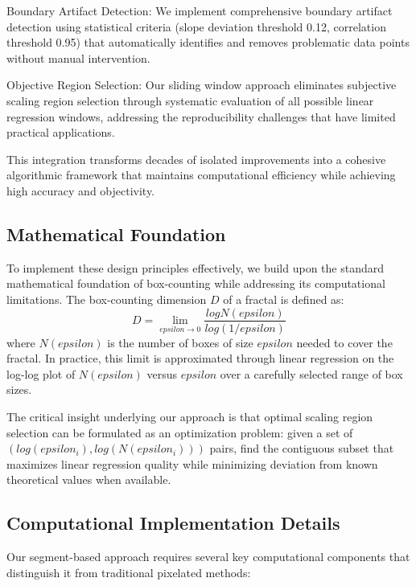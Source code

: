 \documentclass[preprint,12pt]{elsarticle}
\def\textbf#1{#1}%
\def\log{log}%
\def\epsilon{epsilon}%
\begin{document}
\textbf{Boundary Artifact Detection}: We implement comprehensive boundary artifact detection using statistical criteria (slope deviation threshold 0.12, correlation threshold 0.95) that automatically identifies and removes problematic data points without manual intervention.

\textbf{Objective Region Selection}: Our sliding window approach eliminates subjective scaling region selection through systematic evaluation of all possible linear regression windows, addressing the reproducibility challenges that have limited practical applications.

This integration transforms decades of isolated improvements into a cohesive algorithmic framework that maintains computational efficiency while achieving high accuracy and objectivity.

\subsection{Mathematical Foundation}

To implement these design principles effectively, we build upon the standard mathematical foundation of box-counting while addressing its computational limitations.
The box-counting dimension $D$ of a fractal is defined as:
\begin{equation}
D = \lim_{\epsilon \to 0} \frac{\log N(\epsilon)}{\log(1/\epsilon)}
\label{eq:box_counting_def}
\end{equation}
where $N(\epsilon)$ is the number of boxes of size $\epsilon$ needed to cover the fractal. In practice, this limit is approximated through linear regression on the log-log plot of $N(\epsilon)$ versus $\epsilon$ over a carefully selected range of box sizes.

The critical insight underlying our approach is that optimal scaling region selection can be formulated as an optimization problem: given a set of $(log(\epsilon_i), log(N(\epsilon_i)))$ pairs, find the contiguous subset that maximizes linear regression quality while minimizing deviation from known theoretical values when available.

\subsection{Computational Implementation Details}

Our segment-based approach requires several key computational components that distinguish it from traditional pixelated methods:
\end{document}
